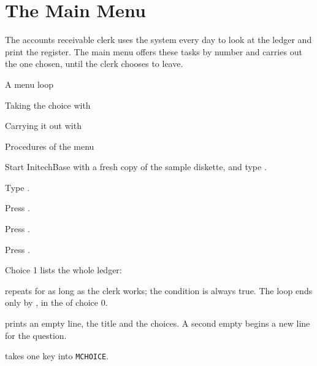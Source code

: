 \chapter{The Main Menu}
The accounts receivable clerk uses the system every day to look at the ledger
and print the register.  The main menu offers these tasks by number and carries
out the one chosen, until the clerk chooses to leave.

\begin{ChapterCovers}
\item A menu loop
\item Taking the choice with 
\item Carrying it out with 
\item Procedures of the menu
\end{ChapterCovers}

Start InitechBase with a fresh copy of the sample diskette, and type
.

\begin{Steps}
\item Type .
\item Press .
\item Press .
\item Press .
\end{Steps}
Choice 1 lists the whole ledger:

 repeats for as long as the clerk works;
the condition is always true.  The loop ends only by , in the
 of choice 0.

 prints an empty line, the title and the choices.  A
second empty  begins a new line for the question.

 takes one key into \texttt{MCHOICE}.

